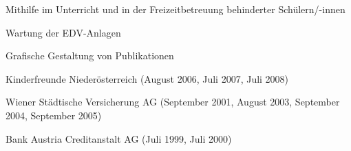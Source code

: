 	{\begin{cvenumerate}
		\item Mithilfe im Unterricht und in der Freizeitbetreuung behinderter
		Schülern/-innen
		\item Wartung der EDV-Anlagen
		\item Grafische Gestaltung von Publikationen
	\end{cvenumerate}}

\nopagebreak
{}
	{\begin{cvenumerate}
		\item Kinderfreunde	Niederösterreich (August 2006, Juli 2007, Juli 2008)
		\item Wiener Städtische Versicherung AG (September 2001, August 2003,
		September 2004, September 2005)
		\item Bank Austria Creditanstalt AG (Juli 1999, Juli 2000)
	\end{cvenumerate}}